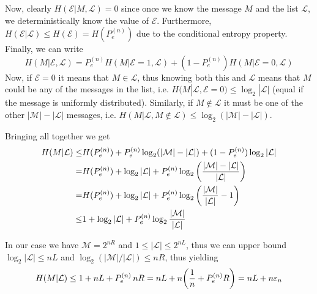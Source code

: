 Now, clearly $H(\mathcal{E}|M,\mathcal{L})=0$ since once we know the message $M$ and the list $\mathcal{L}$, we deterministically know the value of $\mathcal{E}$. Furthermore, $H(\mathcal{E}|\mathcal{L}) \leq H(\mathcal{E}) = H(P_e^{(n)})$ due to the conditional entropy property. Finally, we can write
%
\begin{equation}
H(M|\mathcal{E},\mathcal{L}) = P_e^{(n)} H(M|\mathcal{E}=1,\mathcal{L}) + (1-P_e^{(n)})H(M|\mathcal{E}=0,\mathcal{L})
\end{equation}
%
Now, if $\mathcal{E}=0$ it means that $M \in \mathcal{L}$, thus knowing both this and $\mathcal{L}$ means that $M$ could be any of the messages in the list, i.e. $H(M|\mathcal{L},\mathcal{E}=0) \leq \log_2|\mathcal{L}|$ (equal if the message is uniformly distributed). Similarly, if $M \notin \mathcal{L}$ it must be one of the other $|\mathcal{M}|-|\mathcal{L}|$ messages, i.e. $H(M|\mathcal{L},M\notin \mathcal{L}) \leq \log_2(|\mathcal{M}|-|\mathcal{L}|)$.

Bringing all together we get
%
\begin{align}
\begin{split}
H(M|\mathcal{L}) \leq & H(P_e^{(n)}) + P_e^{(n)}\log_2(|\mathcal{M}|-|\mathcal{L}|) + (1-P_e^{(n)})\log_2|\mathcal{L}|\\
=& H(P_e^{(n)}) + \log_2|\mathcal{L}| + P_e^{(n)}\log_2\qty(\frac{|\mathcal{M}|-|\mathcal{L}|}{|\mathcal{L}|})\\
=& H(P_e^{(n)}) + \log_2|\mathcal{L}| + P_e^{(n)}\log_2\qty(\frac{|\mathcal{M}|}{|\mathcal{L}|} - 1)\\
\leq& 1 + \log_2|\mathcal{L}| + P_e^{(n)}\log_2\frac{|\mathcal{M}|}{|\mathcal{L}|}
\end{split}
\end{align}

In our case we have $\mathcal{M}=2^{nR}$ and $1\leq |\mathcal{L}| \leq 2^{nL}$, thus we can upper bound $\log_2|\mathcal{L}| \leq nL$ and $\log_2(|\mathcal{M}|/|\mathcal{L}|) \leq nR$, thus yielding
%
\begin{equation}
H(M|\mathcal{L}) \leq 1+nL+P_e^{(n)} \, nR = nL + n\qty(\frac{1}{n} + P_e^{(n)} R) = nL + n\varepsilon_n
\end{equation}

